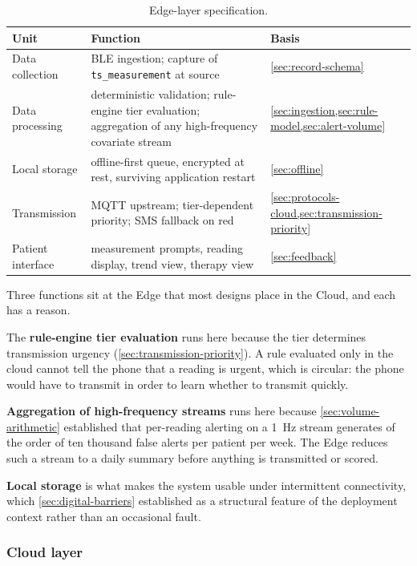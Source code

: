 \documentclass[12pt,a4paper,oneside]{report}
\begin{document}
\begin{table}[htbp]
\centering\small
\caption{Edge-layer specification.}\label{tab:edge-layer}
\begin{tabularx}{\textwidth}{@{}>{\raggedright\arraybackslash}p{2.8cm} X >{\raggedright\arraybackslash}p{3.1cm}@{}}
\toprule
\textbf{Unit} & \textbf{Function} & \textbf{Basis} \\
\midrule
Data collection & BLE ingestion; capture of \texttt{ts\_measurement} at source & \cref{sec:record-schema} \\
Data processing & deterministic validation; rule-engine tier evaluation; aggregation of any high-frequency covariate stream & \cref{sec:ingestion,sec:rule-model,sec:alert-volume} \\
Local storage & offline-first queue, encrypted at rest, surviving application restart & \cref{sec:offline} \\
Transmission & MQTT upstream; tier-dependent priority; SMS fallback on red & \cref{sec:protocols-cloud,sec:transmission-priority} \\
Patient interface & measurement prompts, reading display, trend view, therapy view & \cref{sec:feedback} \\
\bottomrule
\end{tabularx}
\end{table}

Three functions sit at the Edge that most designs place in the Cloud, and each has a reason.

The \textbf{rule-engine tier evaluation} runs here because the tier determines transmission urgency (\cref{sec:transmission-priority}). A rule evaluated only in the cloud cannot tell the phone that a reading is urgent, which is circular: the phone would have to transmit in order to learn whether to transmit quickly.

\textbf{Aggregation of high-frequency streams} runs here because \cref{sec:volume-arithmetic} established that per-reading alerting on a 1~Hz stream generates of the order of ten thousand false alerts per patient per week. The Edge reduces such a stream to a daily summary before anything is transmitted or scored.

\textbf{Local storage} is what makes the system usable under intermittent connectivity, which \cref{sec:digital-barriers} established as a structural feature of the deployment context rather than an occasional fault.

\subsubsection{Cloud layer}\label{sec:cloud-layer}
\end{document}

